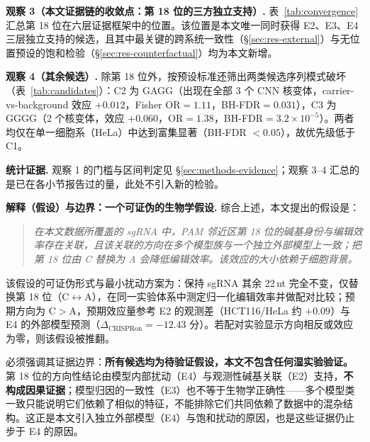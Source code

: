 \textbf{观察 3（本文证据链的收敛点：第 18 位的三方独立支持）.} 表~\ref{tab:convergence} 汇总第 18 位在六层证据框架中的位置。该位置是本文唯一同时获得 E2、E3、E4 三层独立支持的候选，且其中最关键的跨系统一致性（\S\ref{sec:res-external}）与无位置预设的饱和检验（\S\ref{sec:res-counterfactual}）均为本文新增。

\textbf{观察 4（其余候选）.} 除第 18 位外，按预设标准还筛出两类候选序列模式破坏（表~\ref{tab:candidates}）：C2 为 GAGG（出现在全部 3 个 CNN 核变体，carrier-vs-background 效应 $+0.012$，Fisher OR$=1.11$，BH-FDR$=0.031$），C3 为 GGGG（2 个核变体，效应 $+0.060$，OR$=1.38$，BH-FDR$=3.2\times10^{-5}$）。两者均仅在单一细胞系（HeLa）中达到富集显著（BH-FDR $<0.05$），故优先级低于 C1。

\textbf{统计证据.} 观察 1 的门槛与区间判定见 \S\ref{sec:methods-evidence}；观察 3--4 汇总的是已在各小节报告过的量，此处不引入新的检验。

\textbf{解释（假设）与边界：一个可证伪的生物学假设.} 综合上述，本文提出的假设是：

\begin{quote}
\emph{在本文数据所覆盖的 sgRNA 中，PAM 邻近区第 18 位的碱基身份与编辑效率存在关联，且该关联的方向在多个模型族与一个独立外部模型上一致；把第 18 位由 C 替换为 A 会降低编辑效率。该效应的大小依赖于细胞背景。}
\end{quote}

该假设的可证伪形式与最小扰动方案为：保持 sgRNA 其余 22\,nt 完全不变，仅替换第 18 位（C$\leftrightarrow$A），在同一实验体系中测定归一化编辑效率并做配对比较；预期方向为 C$>$A，预期效应量参考 E2 的观测差（HCT116/HeLa 约 $+0.09$）与 E4 的外部模型预测（$\Delta_{\text{CRISPRon}}=-12.43$ 分）。若配对实验显示方向相反或效应为零，则该假设被推翻。

必须强调其证据边界：\textbf{所有候选均为待验证假设，本文不包含任何湿实验验证。} 第 18 位的方向性结论由模型内部扰动（E4）与观测性碱基关联（E2）支持，\textbf{不构成因果证据}；模型归因的一致性（E3）也不等于生物学正确性——多个模型类一致只能说明它们依赖了相似的特征，不能排除它们共同依赖了数据中的混杂结构。这正是本文引入独立外部模型（E4）与饱和扰动的原因，也是这些证据仍止步于 E4 的原因。

